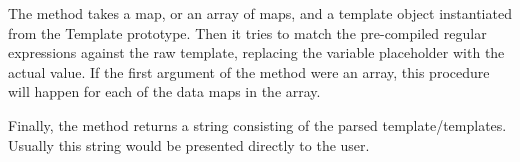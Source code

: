 The method takes a map, or an array of maps, and a template object instantiated from the Template prototype.
Then it tries to match the pre-compiled regular expressions against the raw template, replacing the variable placeholder with the actual value. 
If the first argument of the method were an array, this procedure will happen for each of the data maps in the array.


Finally, the method returns a string consisting of the parsed template/templates. Usually this string would be presented directly to the user.